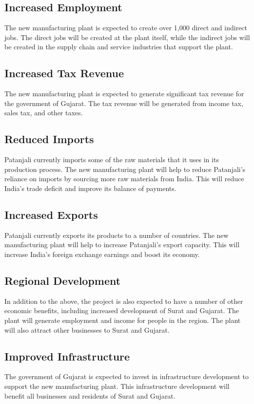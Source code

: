 \subsection{Increased Employment}
The new manufacturing plant is expected to create over 1,000 direct and indirect jobs. The direct jobs will be created at the plant itself, while the indirect jobs will be created in the supply chain and service industries that support the plant.

\subsection{Increased Tax Revenue}
The new manufacturing plant is expected to generate significant tax revenue for the government of Gujarat. The tax revenue will be generated from income tax, sales tax, and other taxes.

\subsection{Reduced Imports}
Patanjali currently imports some of the raw materials that it uses in its production process. The new manufacturing plant will help to reduce Patanjali's reliance on imports by sourcing more raw materials from India. This will reduce India's trade deficit and improve its balance of payments.

\subsection{Increased Exports}
Patanjali currently exports its products to a number of countries. The new manufacturing plant will help to increase Patanjali's export capacity. This will increase India's foreign exchange earnings and boost its economy.

\subsection{Regional Development}
In addition to the above, the project is also expected to have a number of other economic benefits, including increased development of Surat and Gujarat. The plant will generate employment and income for people in the region. The plant will also attract other businesses to Surat and Gujarat.

\subsection{Improved Infrastructure}
The government of Gujarat is expected to invest in infrastructure development to support the new manufacturing plant. This infrastructure development will benefit all businesses and residents of Surat and Gujarat.

